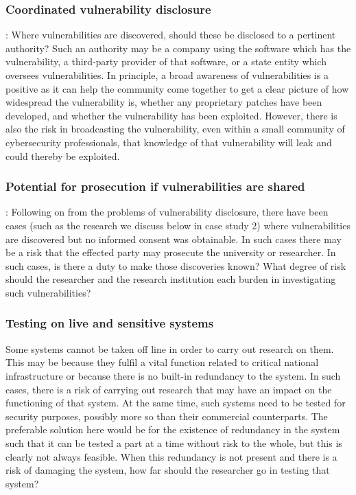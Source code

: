 \documentclass{svjour3}                     %
\begin{document}
\subsubsection{Coordinated vulnerability disclosure}:
Where vulnerabilities are discovered, should these be disclosed to a pertinent authority? Such an authority may be a company using the software which has the vulnerability, a third-party provider of that software, or a state entity which oversees vulnerabilities. In principle, a broad awareness of vulnerabilities is a positive as it can help the community come together to get a clear picture of how widespread the vulnerability is, whether any proprietary patches have been developed, and whether the vulnerability has been exploited. However, there is also the risk in broadcasting the vulnerability, even within a small community of cybersecurity professionals, that knowledge of that vulnerability will leak and could thereby be exploited.

\subsubsection{Potential for prosecution if vulnerabilities are shared}:
Following on from the problems of vulnerability disclosure, there have been cases (such as the research we discuss below in case study 2) where vulnerabilities are discovered but no informed consent was obtainable. In such cases there may be a risk that the effected party may prosecute the university or researcher. In such cases, is there a duty to make those discoveries known? What degree of risk should the researcher and the research institution each burden in investigating such vulnerabilities?

\subsubsection{Testing on live and sensitive systems}
Some systems cannot be taken off line in order to carry out research on them. This may be because they fulfil a vital function related to critical national infrastructure or because there is no built-in redundancy to the system. In such cases, there is a risk of carrying out research that may have an impact on the functioning of that system. At the same time, such systems need to be tested for security purposes, possibly more so than their commercial counterparts. The preferable solution here would be for the existence of redundancy in the system such that it can be tested a part at a time without risk to the whole, but this is clearly not always feasible. When this redundancy is not present and there is a risk of damaging the system, how far should the researcher go in testing that system?
\end{document}
